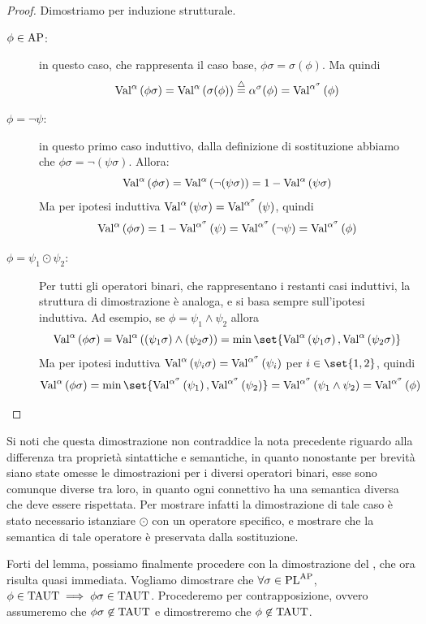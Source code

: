 \begin{proof}
  Dimostriamo per induzione strutturale.

  \begin{description}
    \item[\(\phi \in \AP\):] in questo caso, che rappresenta il caso base, \(\phi\sigma = \sigma(\phi)\). Ma quindi
      \[\Val{\alpha}[\phi\sigma] = \Val{\alpha}[\sigma(\phi)] \eqdef \alpha^\sigma(\phi) = \Val{\alpha^\sigma}[\phi]\]
    \item[\(\phi = \neg \psi\):] in questo primo caso induttivo, dalla definizione di sostituzione abbiamo che \(\phi\sigma = \neg (\psi\sigma)\). Allora:
      \[\Val{\alpha}[\phi\sigma] = \Val{\alpha}[\neg (\psi\sigma)] = 1 - \Val{\alpha}[\psi\sigma]\]
      Ma per ipotesi induttiva \(\Val{\alpha}[\psi\sigma] = \Val{\alpha^\sigma}[\psi]\), quindi
      \[\Val{\alpha}[\phi\sigma] = 1 - \Val{\alpha^\sigma}[\psi] = \Val{\alpha^\sigma}[\neg \psi] = \Val{\alpha^\sigma}[\phi]\]
    \item[\(\phi = \psi_1 \odot \psi_2\):] Per tutti gli operatori binari, che rappresentano i restanti casi induttivi, la struttura di dimostrazione è analoga, e si basa sempre sull'ipotesi induttiva. Ad esempio, se \(\phi = \psi_1 \land \psi_2\) allora
      \[\Val{\alpha}[\phi\sigma] = \Val{\alpha}[(\psi_1\sigma) \land (\psi_2\sigma)] = \min\set{\Val{\alpha}[\psi_1\sigma], \Val{\alpha}[\psi_2\sigma]}\]
      Ma per ipotesi induttiva \(\Val{\alpha}[\psi_i\sigma] = \Val{\alpha^\sigma}[\psi_i]\) per \(i\in\set{1,2}\), quindi
      \[\Val{\alpha}[\phi\sigma] = \min\set{\Val{\alpha^\sigma}[\psi_1], \Val{\alpha^\sigma}[\psi_2]} = \Val{\alpha^\sigma}[\psi_1 \land \psi_2] = \Val{\alpha^\sigma}[\phi]\]
  \end{description}
\end{proof}

\begin{note}{}
  Si noti che questa dimostrazione non contraddice la nota precedente riguardo alla differenza tra proprietà sintattiche e semantiche, in quanto nonostante per brevità siano state omesse le dimostrazioni per i diversi operatori binari, esse sono comunque diverse tra loro, in quanto ogni connettivo ha una semantica diversa che deve essere rispettata. Per mostrare infatti la dimostrazione di tale caso è stato necessario istanziare \(\odot\) con un operatore specifico, e mostrare che la semantica di tale operatore è preservata dalla sostituzione.
\end{note}

Forti del lemma, possiamo finalmente procedere con la dimostrazione del , che ora risulta quasi immediata.
Vogliamo dimostrare che \(\forall \sigma \in \PL^{\AP}\), \(\phi \in \Taut \implies \phi\sigma \in \Taut\).
Procederemo per contrapposizione, ovvero assumeremo che \(\phi\sigma \not\in \Taut\) e dimostreremo che \(\phi \not\in \Taut\).


